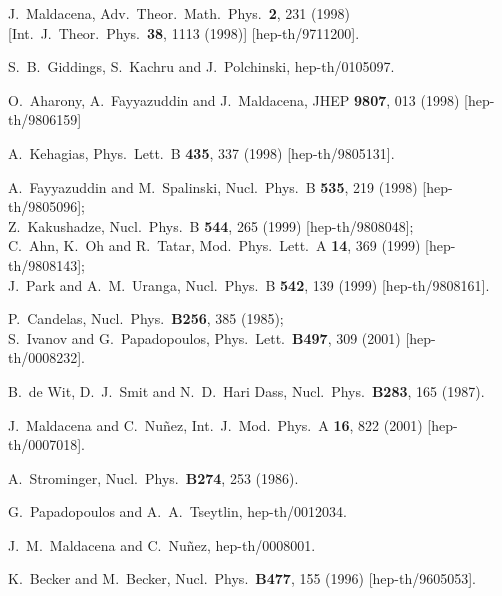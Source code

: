 \documentclass[a4paper,12pt]{article}
\renewcommand{\=}[1]{\bar{#1}}
\begin{document}
\begin{thebibliography}{10}
\baselineskip=15pt

J.~Maldacena,
Adv.\ Theor.\ Math.\ Phys.\  {\bf 2}, 231 (1998)
[Int.\ J.\ Theor.\ Phys.\  {\bf 38}, 1113 (1998)]
[hep-th/9711200].

S.~B.~Giddings, S.~Kachru and J.~Polchinski,
hep-th/0105097.

O.~Aharony, A.~Fayyazuddin and J.~Maldacena,
JHEP {\bf 9807}, 013 (1998)
[hep-th/9806159]

A.~Kehagias,
Phys.\ Lett.\ B {\bf 435}, 337 (1998)
[hep-th/9805131].

A.~Fayyazuddin and M.~Spalinski,
Nucl.\ Phys.\ B {\bf 535}, 219 (1998)
[hep-th/9805096];\\
Z.~Kakushadze,
Nucl.\ Phys.\ B {\bf 544}, 265 (1999)
[hep-th/9808048];\\
C.~Ahn, K.~Oh and R.~Tatar,
Mod.\ Phys.\ Lett.\ A {\bf 14}, 369 (1999)
[hep-th/9808143];\\
J.~Park and A.~M.~Uranga,
Nucl.\ Phys.\ B {\bf 542}, 139 (1999)
[hep-th/9808161].

P.~Candelas,
Nucl.\ Phys.\ {\bf B256}, 385 (1985);\\
S.~Ivanov and G.~Papadopoulos,
Phys.\ Lett.\ {\bf B497}, 309 (2001)
[hep-th/0008232].

B.~de Wit, D.~J.~Smit and N.~D.~Hari Dass,
Nucl.\ Phys.\ {\bf B283}, 165 (1987).

J.~Maldacena and C.~Nu\~nez,
Int.\ J.\ Mod.\ Phys.\ A {\bf 16}, 822 (2001)
[hep-th/0007018].

A.~Strominger,
Nucl.\ Phys.\ {\bf B274}, 253 (1986).

G.~Papadopoulos and A.~A.~Tseytlin,
hep-th/0012034.

J.~M.~Maldacena and C.~Nu\~nez,
hep-th/0008001.

K.~Becker and M.~Becker,
Nucl.\ Phys.\ {\bf B477}, 155 (1996)
[hep-th/9605053].


\end{thebibliography}
\end{document}
